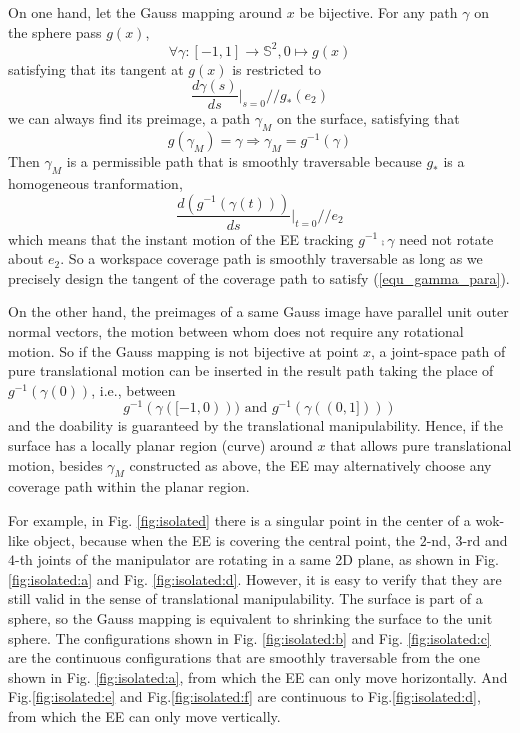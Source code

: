 \documentclass[Afour,sageh,times]{sagej}
\begin{document}
On one hand, let the Gauss mapping around $x$ be bijective.
For any path $\gamma$ on the sphere pass $g(x)$, 
\begin{equation}\label{equ_gamma}
\forall \gamma: [-1, 1]\rightarrow \mathbb{S}^2, 0\mapsto g(x)
\end{equation}
satisfying that its tangent at $g(x)$ is restricted to 
\begin{equation}\label{equ_gamma_direction}
\frac{d\gamma(s)}{ds}|_{s = 0} // g_*(e_2)
\end{equation}
we can always find its preimage, a path $\gamma_M$ on the surface, satisfying that 
\begin{equation}\label{equ_gammam}
g(\gamma_M) = \gamma\Rightarrow \gamma_M = g^{-1}(\gamma)
\end{equation} 
Then $\gamma_M$ is a permissible path that is smoothly traversable because $g_*$ is a homogeneous tranformation, 
\begin{equation}\label{equ_gamma_para}
\frac{d(g^{-1}(\gamma(t)))}{ds}|_{t = 0} // e_2
\end{equation}
which means that the instant motion of the EE tracking $g^{-1}\comp\gamma$ need not rotate about $e_2$. 
So a workspace coverage path is smoothly traversable as long as we precisely design the tangent of the coverage path to satisfy (\ref{equ_gamma_para}). 

On the other hand, the preimages of a same Gauss image have parallel unit outer normal vectors, the motion between whom does not require any rotational motion. 
So if the Gauss mapping is not bijective at point $x$, a joint-space path of pure translational motion can be inserted in the result path taking the place of $g^{-1}(\gamma(0))$, i.e., between
\begin{equation}
g^{-1}(\gamma([-1, 0)))\mbox{ and }g^{-1}(\gamma((0, 1])))
\end{equation}
and the doability is guaranteed by the translational manipulability. 
Hence, if the surface has a locally planar region (curve) around $x$ that allows pure translational motion, besides $\gamma_M$ constructed as above, the EE may alternatively choose any coverage path within the planar region. 


For example, in Fig. \ref{fig:isolated} there is a singular point in the center of a wok-like object, because when the EE is covering the central point, the $2$-nd, $3$-rd and $4$-th joints of the manipulator are rotating in a same 2D plane, as shown in Fig. \ref{fig:isolated:a} and Fig. \ref{fig:isolated:d}. However, it is easy to verify that they are still valid in the sense of translational manipulability. 
The surface is part of a sphere, so the Gauss mapping is equivalent to shrinking the surface to the unit sphere. The configurations shown in Fig. \ref{fig:isolated:b} and Fig. \ref{fig:isolated:c} are the continuous configurations that are smoothly traversable from the one shown in Fig. \ref{fig:isolated:a}, from which the EE can only move horizontally. 
And Fig.\ref{fig:isolated:e} and Fig.\ref{fig:isolated:f} are continuous to Fig.\ref{fig:isolated:d}, from which the EE can only move vertically. 
\end{document}
